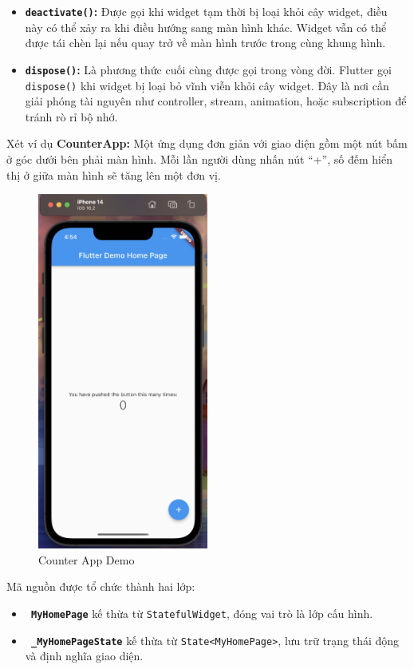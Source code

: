 \documentclass[../DoAn.tex]{subfiles}
\numberwithin{figure}{chapter}
\begin{document}
\begin{itemize}
\item \textbf{\texttt{deactivate()}:}
Được gọi khi widget tạm thời bị loại khỏi cây widget, điều này có thể xảy ra khi điều hướng sang màn hình khác. Widget vẫn có thể được tái chèn lại nếu quay trở về màn hình trước trong cùng khung hình. 

\item \textbf{\texttt{dispose()}:}
Là phương thức cuối cùng được gọi trong vòng đời. Flutter gọi \texttt{dispose()} khi widget bị loại bỏ vĩnh viễn khỏi cây widget. Đây là nơi cần giải phóng tài nguyên như controller, stream, animation, hoặc subscription để tránh rò rỉ bộ nhớ. 
\end{itemize}

Xét ví dụ \textbf{CounterApp:} Một ứng dụng đơn giản với giao diện gồm một nút bấm ở góc dưới bên phải màn hình. Mỗi lần người dùng nhấn nút “+”, số đếm hiển thị ở giữa màn hình sẽ tăng lên một đơn vị. 
\begin{figure}[H]
    \centering
    \includegraphics[width=0.5\textwidth]{Hinhve/Chuong5/counterapp.png}
    \caption{Counter App Demo}
    \label{fig:counterapp}
\end{figure}

Mã nguồn được tổ chức thành hai lớp:
\begin{itemize}
\item \textbf{\texttt{ MyHomePage}} kế thừa từ \texttt{StatefulWidget}, đóng vai trò là lớp cấu hình.
\item \textbf{\texttt{ \_MyHomePageState}} kế thừa từ \texttt{State<MyHomePage>}, lưu trữ trạng thái động và định nghĩa giao diện.
\end{itemize}
\end{document}
